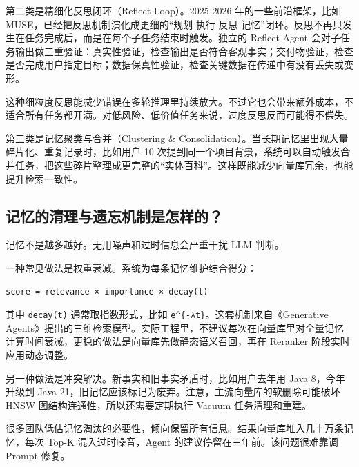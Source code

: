 \documentclass[9pt,a4paper,twocolumn]{ctexart}
\begin{document}
第二类是精细化反思闭环（Reflect Loop）。2025-2026 年的一些前沿框架，比如 MUSE，已经把反思机制演化成更细的“规划-执行-反思-记忆”闭环。反思不再只发生在任务完成后，而是在每个子任务结束时触发。独立的 Reflect Agent 会对子任务输出做三重验证：真实性验证，检查输出是否符合客观事实；交付物验证，检查是否完成用户指定目标；数据保真性验证，检查关键数据在传递中有没有丢失或变形。



这种细粒度反思能减少错误在多轮推理里持续放大。不过它也会带来额外成本，不适合所有任务都开满。对低风险、低价值任务来说，过度反思反而可能得不偿失。



第三类是记忆聚类与合并（Clustering \& Consolidation）。当长期记忆里出现大量碎片化、重复记录时，比如用户 10 次提到同一个项目背景，系统可以自动触发合并任务，把这些碎片整理成更完整的“实体百科”。这样既能减少向量库冗余，也能提升检索一致性。



\subsection*{记忆的清理与遗忘机制是怎样的？}


记忆不是越多越好。无用噪声和过时信息会严重干扰 LLM 判断。



一种常见做法是权重衰减。系统为每条记忆维护综合得分：



\begin{lstlisting}
score = relevance × importance × decay(t)
\end{lstlisting}



其中 \texttt{decay(t)} 通常取指数形式，比如 \texttt{e\textasciicircum{}\{-λt\}}。这套机制来自《Generative Agents》提出的三维检索模型。实际工程里，不建议每次在向量库里对全量记忆计算时间衰减，更稳的做法是向量库先做静态语义召回，再在 Reranker 阶段实时应用动态调整。



另一种做法是冲突解决。新事实和旧事实矛盾时，比如用户去年用 Java 8，今年升级到 Java 21，旧记忆应该标记为废弃。注意，主流向量库的软删除可能破坏 HNSW 图结构连通性，所以还需要定期执行 Vacuum 任务清理和重建。



很多团队低估记忆淘汰的必要性，倾向保留所有信息。结果向量库堆入几十万条记忆，每次 Top-K 混入过时噪音，Agent 的建议停留在三年前。该问题很难靠调 Prompt 修复。
\end{document}
